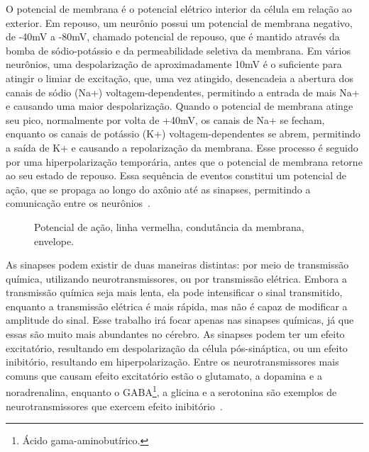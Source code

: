 O potencial de membrana é o potencial elétrico interior da célula em relação ao exterior. Em repouso, um neurônio possui um
potencial de membrana negativo, de -40mV a -80mV, chamado potencial de repouso, que é mantido através da bomba de sódio-potássio e
da permeabilidade seletiva da membrana. Em vários neurônios, uma despolarização de aproximadamente 10mV é o suficiente para
atingir o limiar de excitação, que, uma vez atingido, desencadeia a abertura dos canais de sódio (Na+) voltagem-dependentes,
permitindo a entrada de mais Na+ e causando uma maior despolarização. Quando o potencial de membrana atinge seu pico, normalmente
por volta de +40mV, os canais de Na+ se fecham, enquanto os canais de potássio (K+) voltagem-dependentes se abrem, permitindo a
saída de K+ e causando a repolarização da membrana. Esse processo é seguido por uma hiperpolarização temporária, antes que o potencial de
membrana retorne ao seu estado de repouso. Essa sequência de eventos constitui um potencial de ação, que se propaga ao longo do
axônio até as sinapses, permitindo a comunicação entre os neurônios~\cite{kandelPrinciples2021}.

\begin{figure}[!ht]
\caption{Potencial de ação, linha vermelha, condutância da membrana, envelope.}
\end{figure}

As sinapses podem existir de duas maneiras distintas: por meio de transmissão química, utilizando neurotransmissores, ou por
transmissão elétrica. Embora a transmissão química seja mais lenta, ela pode intensificar o sinal transmitido, enquanto a
transmissão elétrica é mais rápida, mas não é capaz de modificar a amplitude do sinal. Esse trabalho irá focar apenas nas sinapses
químicas, já que essas são muito mais abundantes no cérebro. As sinapses podem ter um efeito excitatório, resultando em
despolarização da célula pós-sináptica, ou um efeito inibitório, resultando em hiperpolarização. Entre os neurotransmissores mais
comuns que causam efeito excitatório estão o glutamato, a dopamina e a noradrenalina, enquanto o GABA\footnote{Ácido
gama-aminobutírico.}, a glicina e a serotonina são exemplos de neurotransmissores que exercem efeito
inibitório~\cite{kandelPrinciples2021}.

